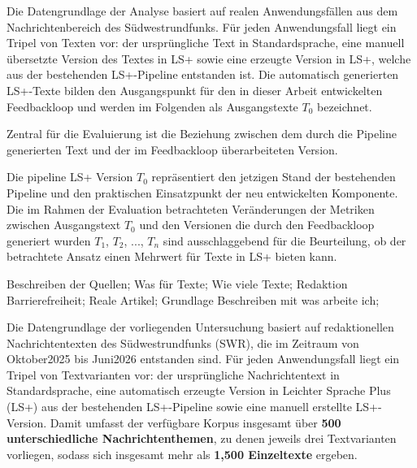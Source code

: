
Die Datengrundlage der Analyse basiert auf realen Anwendungsfällen aus dem Nachrichtenbereich des Südwestrundfunks.
Für jeden Anwendungsfall liegt ein Tripel von Texten vor: der ursprüngliche Text in Standardsprache, eine manuell übersetzte Version des Textes in LS+ sowie eine erzeugte Version in LS+, welche aus der bestehenden LS+-Pipeline entstanden ist.
Die automatisch generierten LS+-Texte bilden den Ausgangspunkt für den in dieser Arbeit entwickelten Feedbackloop und werden im Folgenden als Ausgangstexte $T_0$ bezeichnet.

Zentral für die Evaluierung ist die Beziehung zwischen dem durch die Pipeline generierten Text und der im Feedbackloop überarbeiteten Version.

Die pipeline LS+ Version $T_0$ repräsentiert den jetzigen Stand der bestehenden Pipeline und den praktischen Einsatzpunkt der neu entwickelten Komponente.
Die im Rahmen der Evaluation betrachteten Veränderungen der Metriken zwischen Ausgangstext $T_0$ und den Versionen die durch den Feedbackloop generiert wurden $T_1$, $T_2$, ..., $T_n$ sind ausschlaggebend für die Beurteilung, ob der betrachtete Ansatz einen Mehrwert für Texte in LS+ bieten kann.

Beschreiben der Quellen; Was für Texte; Wie viele Texte; Redaktion Barrierefreiheit; Reale Artikel;
Grundlage Beschreiben mit was arbeite ich;


Die Datengrundlage der vorliegenden Untersuchung basiert auf redaktionellen Nachrichtentexten des Südwestrundfunks (SWR), die im Zeitraum von Oktober2025 bis Juni2026 entstanden sind. Für jeden Anwendungsfall liegt ein Tripel von Textvarianten vor: der ursprüngliche Nachrichtentext in Standardsprache, eine automatisch erzeugte Version in Leichter Sprache Plus (LS+) aus der bestehenden LS+-Pipeline sowie eine manuell erstellte LS+-Version. Damit umfasst der verfügbare Korpus insgesamt über \textbf{500 unterschiedliche Nachrichtenthemen}, zu denen jeweils drei Textvarianten vorliegen, sodass sich insgesamt mehr als \textbf{1,500 Einzeltexte} ergeben.

